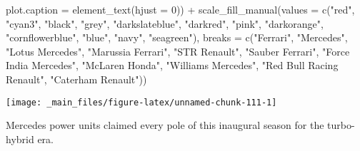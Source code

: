 \documentclass[
]{book}
\newenvironment{Shaded}{\begin{snugshade}}{\end{snugshade}}
\newcommand{\AttributeTok}[1]{\textcolor[rgb]{0.77,0.63,0.00}{#1}}
\newcommand{\DecValTok}[1]{\textcolor[rgb]{0.00,0.00,0.81}{#1}}
\newcommand{\FunctionTok}[1]{\textcolor[rgb]{0.00,0.00,0.00}{#1}}
\newcommand{\NormalTok}[1]{#1}
\newcommand{\SpecialCharTok}[1]{\textcolor[rgb]{0.00,0.00,0.00}{#1}}
\newcommand{\StringTok}[1]{\textcolor[rgb]{0.31,0.60,0.02}{#1}}
\begin{document}
\begin{Shaded}
\begin{Highlighting}[]
        \AttributeTok{plot.caption =} \FunctionTok{element\_text}\NormalTok{(}\AttributeTok{hjust =} \DecValTok{0}\NormalTok{)) }\SpecialCharTok{+}
  \FunctionTok{scale\_fill\_manual}\NormalTok{(}\AttributeTok{values =} \FunctionTok{c}\NormalTok{(}\StringTok{"red"}\NormalTok{, }
                                \StringTok{"cyan3"}\NormalTok{,  }
                                \StringTok{"black"}\NormalTok{, }
                                \StringTok{"grey"}\NormalTok{,}
                               \StringTok{"darkslateblue"}\NormalTok{, }
                                \StringTok{"darkred"}\NormalTok{,  }
                                \StringTok{"pink"}\NormalTok{, }
                                \StringTok{"darkorange"}\NormalTok{, }
                                \StringTok{"cornflowerblue"}\NormalTok{,}
                                \StringTok{"blue"}\NormalTok{,}
                               \StringTok{"navy"}\NormalTok{,}
                               \StringTok{"seagreen"}\NormalTok{),}
                     \AttributeTok{breaks =} \FunctionTok{c}\NormalTok{(}\StringTok{"Ferrari"}\NormalTok{,}
                                 \StringTok{"Mercedes"}\NormalTok{,}
                                 \StringTok{"Lotus Mercedes"}\NormalTok{,}
                                 \StringTok{"Marussia Ferrari"}\NormalTok{,}
                                \StringTok{"STR Renault"}\NormalTok{,}
                                 \StringTok{"Sauber Ferrari"}\NormalTok{, }
                                 \StringTok{"Force India Mercedes"}\NormalTok{,}
                                 \StringTok{"McLaren Honda"}\NormalTok{,}
                                 \StringTok{"Williams Mercedes"}\NormalTok{,}
                                 \StringTok{"Red Bull Racing Renault"}\NormalTok{,}
                                \StringTok{"Caterham Renault"}\NormalTok{))}
\end{Highlighting}
\end{Shaded}

\begin{center}\texttt{[image: \_main\_files/figure-latex/unnamed-chunk-111-1]} \end{center}

Mercedes power units claimed every pole of this inaugural season for the turbo-hybrid era.
\end{document}
